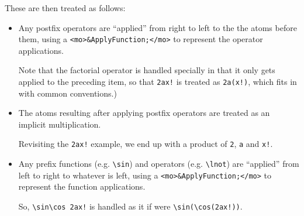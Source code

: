 These are then treated as follows:

\begin{itemize}

\item Any postfix operators are ``applied'' from right to left to the
the atoms before them, using a \verb|<mo>&ApplyFunction;</mo>| to represent the
operator applications.

Note that the factorial operator is handled specially in that it only
gets applied to the preceding item, so that \verb|2ax!| is treated as
\verb|2a(x!)|, which fits in with common conventions.)


\item The atoms resulting after applying postfix operators are treated as an
implicit multiplication.

Revisiting the \verb|2ax!| example, we end up with a product of \verb|2|,
\verb|a| and \verb|x!|.


\item Any prefix functions (e.g. \verb|\sin|) and operators
(e.g. \verb|\lnot|) are ``applied'' from left to right to
whatever is left, using a \verb|<mo>&ApplyFunction;</mo>| to represent the
function applications.

So, \verb|\sin\cos 2ax!| is handled as it if were \verb|\sin(\cos(2ax!))|.


\end{itemize}
